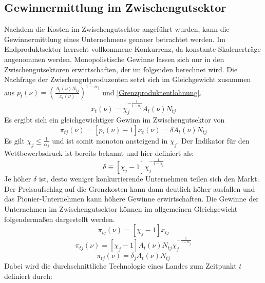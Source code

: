 \subsection{Gewinnermittlung im Zwischengutsektor}\label{sec:Gewinnermittlung Zwischengutsektor}
Nachdem die Kosten im Zwischengutsektor angeführt wurden, kann die Gewinnermittlung eines Unternehmens genauer betrachtet werden. Im Endproduktsektor herrscht vollkommene Konkurrenz, da konstante Skalenerträge angenommen werden. Monopolistische Gewinne lassen sich nur in den Zwischengutsektoren erwirtschaften, der im folgenden berechnet wird. Die Nachfrage der Zwischengutproduzenten setzt sich im Gleichgewicht zusammen aus $p_t(\nu)=\left(\frac{A_t(\nu)N_{tj}}{x_t(\nu)}\right)^{1-\alpha_j}$ und \eqref{Grenzproduktentlohnung}.
%
	\begin{equation*}
		x_t(\nu)=\chi_j^{-\frac{1}{1-\alpha_j}}A_t(\nu)N_{tj}\label{gleichgewichtige Nachfrage}
	\end{equation*}
%
Es ergibt sich ein gleichgewichtiger Gewinn im Zwischengutsektor von
%
	\begin{equation}
		\pi_{tj}(\nu)=[p_t(\nu)-1]x_t(\nu)=\delta A_t(\nu)N_{tj}\label{Gewinn Zwischengutsektor}
	\end{equation}
%
Es gilt $\chi_j\leq\frac{1}{\alpha_j}$ und ist somit monoton ansteigend in $\chi_j$. Der Indikator für den Wettbewerbsdruck ist bereits bekannt und hier definiert als: 
%
	\begin{equation}
		\delta\equiv[\chi_j-1]\chi_j^{-\frac{1}{1-\alpha_j}}
	\end{equation}
%
Je höher $\delta$ ist, desto weniger konkurrierende Unternehmen teilen sich den Markt. Der Preisaufschlag auf die Grenzkosten kann dann deutlich höher ausfallen und das Pionier-Unternehmen kann höhere Gewinne erwirtschaften. Die Gewinne der Unternehmen im Zwischengutsektor können im allgemeinen Gleichgewicht folgendermaßen dargestellt werden.
%
	\begin{equation}
		\pi_{tj}(\nu)=[\chi_{j}-1]x_{tj}
	\end{equation}
%
\vspace{-0.5cm}
%
	\begin{equation}
		\pi_{tj}(\nu)=[\chi_{j}-1]A_{t}(\nu)N_{tj}\chi_{j}^{-\frac{1}{1-\alpha_{j}}}
	\end{equation}
%
\vspace{-0.5cm}
%	
	\begin{equation}
		\pi_{tj}(\nu)=\delta_{j}A_{t}(\nu)N_{tj}
	\end{equation}
%
Dabei wird die durchschnittliche Technologie eines Landes zum Zeitpunkt $t$ definiert durch: 
